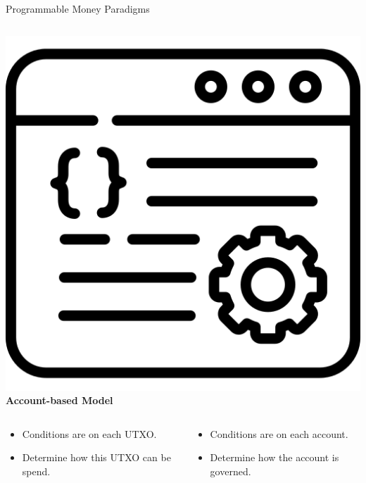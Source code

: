 \documentclass[handout]{beamer}
\begin{document}
\begin{frame}{Programmable Money Paradigms}
\begin{columns}[T]
\begin{column}{0.45\textwidth}
			\includegraphics[scale=0.1]{../assets/images/CA.png}
			\textbf{Account-based Model}
		\end{column}
	\end{columns}
	\vspace{1em}
	\begin{columns}[T]
		\begin{column}{0.45\textwidth}
		\vspace{1em}
			\begin{itemize}
				\item Conditions are on each UTXO.
				\item Determine how this UTXO can be spend.
			\end{itemize}
		\end{column}
		\begin{column}{0.45\textwidth}
		\vspace{1em}
			\begin{itemize}
				\item Conditions are on each account.
				\item Determine how the account is governed.
			\end{itemize}
		\end{column}
	\end{columns}
\vspace{1em}
\end{frame}
\end{document}
